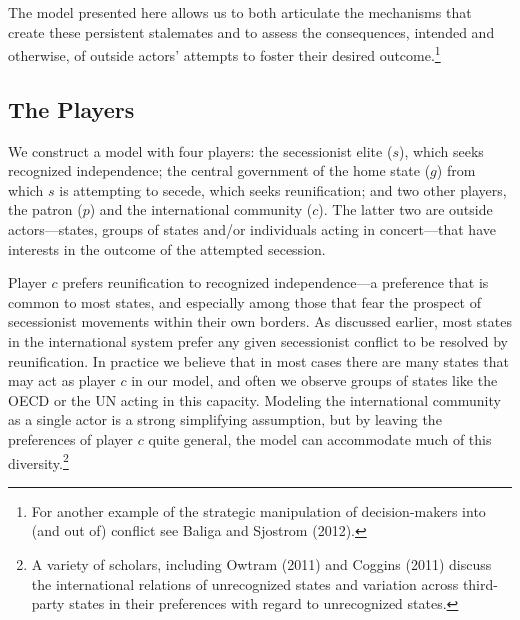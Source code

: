 \documentclass[11pt,letterpaper, notitlepage]{article}
\begin{document}
The model presented here allows us to both articulate the mechanisms that create these persistent stalemates and to assess the consequences, intended and otherwise, of outside actors' attempts to foster their desired outcome.\footnote{For another example of the strategic manipulation of decision-makers into (and out of) conflict see Baliga and Sjostrom (2012).}

\subsection{The Players}

We construct a model with four players: the secessionist elite ($s$), which seeks recognized independence; the central government of the home state ($g$) from which $s$ is attempting to secede, which seeks reunification; and two other players, the patron ($p$) and the international community ($c$). The latter two are outside actors---states, groups of states and/or individuals acting in concert---that have interests in the outcome of the attempted secession.

Player $c$ prefers reunification to recognized independence---a preference that is common to most states, and especially among those that fear the prospect of secessionist movements within their own borders. As discussed earlier, most states in the international system prefer any given secessionist conflict to be resolved by reunification. In practice we believe that in most cases there are many states that may act as player $c$ in our model, and often we observe groups of states like the OECD or the UN acting in this capacity. Modeling the international community as a single actor is a strong simplifying assumption, but by leaving the preferences of player $c$ quite general, the model can accommodate much of this diversity.\footnote{A variety of scholars, including Owtram (2011) and Coggins (2011) discuss the international relations of unrecognized states and variation across third-party states in their preferences with regard to unrecognized states.}
\end{document}
